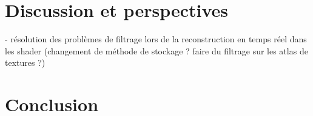 \Conclusion \label{chap:conclusion}

\section{Discussion et perspectives}

- résolution des problèmes de filtrage lors de la reconstruction en temps réel dans les shader (changement de méthode de stockage ? faire du filtrage sur les atlas de textures ?)


\section{Conclusion}
